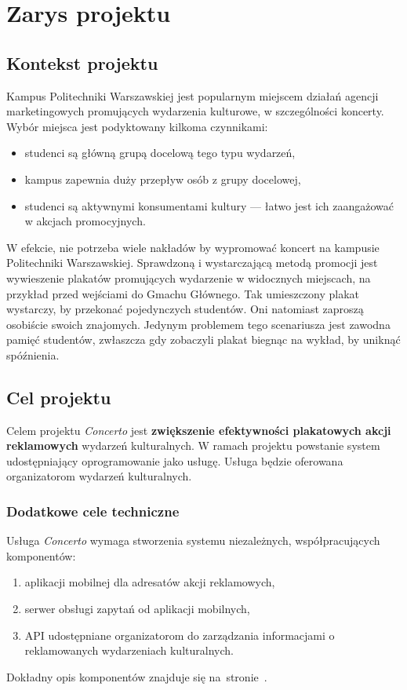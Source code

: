 \newpage
\section{Zarys projektu}

\subsection{Kontekst projektu}
Kampus Politechniki Warszawskiej jest popularnym miejscem działań agencji
marketingowych promujących wydarzenia kulturowe, w szczególności koncerty. Wybór
miejsca jest podyktowany kilkoma czynnikami:
\begin{itemize}
    \item studenci są główną grupą docelową tego typu wydarzeń,
    \item kampus zapewnia duży przepływ osób z grupy docelowej,
    \item studenci są aktywnymi konsumentami kultury --- łatwo jest ich
        zaangażować w akcjach promocyjnych.
\end{itemize}
W efekcie, nie potrzeba wiele nakładów by wypromować koncert na kampusie
Politechniki Warszawskiej. Sprawdzoną i wystarczającą metodą promocji jest
wywieszenie plakatów promujących wydarzenie w widocznych miejscach, na przykład
przed wejściami do Gmachu Głównego. Tak umieszczony plakat wystarczy, by
przekonać pojedynczych studentów. Oni natomiast zaproszą osobiście swoich
znajomych. Jedynym problemem tego scenariusza jest zawodna pamięć studentów,
zwłaszcza gdy zobaczyli plakat biegnąc na wykład, by uniknąć spóźnienia.

\subsection{Cel projektu}
Celem projektu \emph{Concerto} jest \textbf{zwiększenie efektywności plakatowych
akcji reklamowych} wydarzeń kulturalnych. W ramach projektu powstanie system
udostępniający oprogramowanie jako usługę. Usługa będzie oferowana organizatorom
wydarzeń kulturalnych.

\subsubsection{Dodatkowe cele techniczne}
Usługa \emph{Concerto} wymaga stworzenia systemu niezależnych, współpracujących
komponentów:
\begin{enumerate}
    \item aplikacji mobilnej dla adresatów akcji reklamowych,
    \item serwer obsługi zapytań od aplikacji mobilnych,
    \item API udostępniane organizatorom do zarządzania informacjami o
        reklamowanych wydarzeniach kulturalnych.
\end{enumerate}
Dokładny opis komponentów znajduje się na~stronie~\pageref{sec:produkty}.


